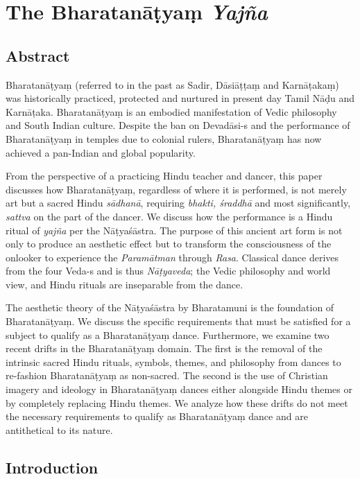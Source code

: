 
\chapter{The Bharatanāṭyaṃ \textit{Yajña}}\label{chap11}



\section*{Abstract}

Bharatanāṭyaṃ (referred to in the past as Sadir, Dāsiāṭṭaṃ and Karnāṭakaṃ) was historically practiced, protected and nurtured in present day Tamil Nāḍu and Karnāṭaka. Bharatanāṭyaṃ is an embodied manifestation of Vedic philosophy and South Indian culture. Despite the ban on Devadāsi-s and the performance of Bharatanāṭyaṃ in temples due to colonial rulers, Bharatanāṭyaṃ has now achieved a pan-Indian and global popularity.

From the perspective of a practicing Hindu teacher and dancer, this paper discusses how Bharatanāṭyaṃ, regardless of where it is performed, is not merely art but a sacred Hindu \textit{sādhanā}, requiring \textit{bhakti, śraddhā} and most significantly, \textit{sattva} on the part of the dancer. We discuss how the performance is a Hindu ritual of \textit{yajña} per the Nāṭyaśāstra. The purpose of this ancient art form is not only to produce an aesthetic effect but to transform the consciousness of the onlooker to experience the \textit{Paramātman} through \textit{Rasa}. Classical dance derives from the four Veda-s and is thus \textit{Nāṭyaveda}; the Vedic philosophy and world view, and Hindu rituals are inseparable from the dance.

The aesthetic theory of the Nāṭyaśāstra by Bharatamuni is the foundation of Bharatanāṭyaṃ. We discuss the specific requirements that must be satisfied for a subject to qualify as a Bharatanāṭyaṃ dance. Furthermore, we examine two recent drifts in the Bharatanāṭyaṃ domain. The first is the removal of the intrinsic sacred Hindu rituals, symbols, themes, and philosophy from dances to re-fashion Bharata\-nāṭyaṃ as non-sacred. The second is the use of Christian imagery and ideology in Bharatanāṭyaṃ dances either alongside Hindu themes or by completely replacing Hindu themes. We analyze how these drifts do not meet the necessary requirements to qualify as Bharatanāṭyaṃ dance and are antithetical to its nature.


\section*{Introduction}


